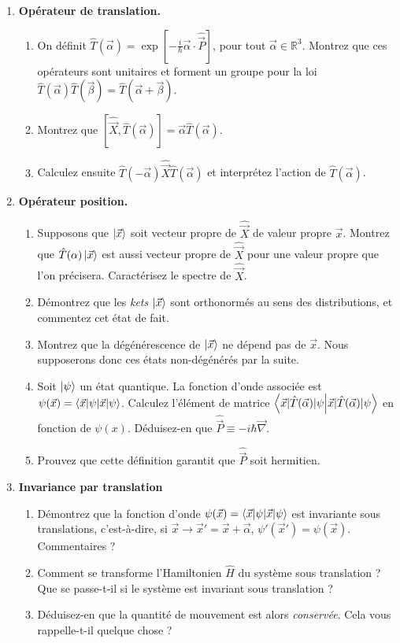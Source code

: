 \begin{enumerate}
\item \textbf{Opérateur de translation.}
\begin{enumerate}
\item On définit $\hat T(\vec\alpha) = \exp \left[{-\frac{i}{\hbar}\vec\alpha \cdot \hat{\vec P}}\right]$, pour tout $\vec\alpha \in \mathbb R^3$. Montrez que ces opérateurs sont unitaires et forment un groupe pour la loi $\hat T(\vec\alpha)\hat T(\vec\beta) = \hat T(\vec\alpha+\vec\beta)$. 
\item Montrez que $[\hat{\vec X},\hat T(\vec \alpha)] = \vec\alpha \hat T(\vec\alpha)$. 
\item Calculez ensuite $\hat T(-\vec\alpha) \hat{\vec X} \hat T(\vec\alpha)$ et interprétez l'action de $\hat T(\vec\alpha)$.
\end{enumerate}

\item \textbf{Opérateur position.}
\begin{enumerate}
\item Supposons que $\ket{\vec x}$ soit vecteur propre de $\hat{\vec X}$ de valeur propre $\vec x$. Montrez que $\hat T(\alpha)\ket{\vec x}$ est aussi vecteur propre de $\hat{\vec X}$ pour une valeur propre que l'on précisera. Caractérisez le spectre de $\hat{\vec X}$.
\item Démontrez que les \textit{kets} $\ket{\vec x}$ sont orthonormés au sens des distributions, et commentez cet état de fait. 
\item Montrez que la dégénérescence de $\ket{\vec x}$ ne dépend pas de $\vec x$. Nous supposerons donc ces états non-dégénérés par la suite.
\item Soit $\ket{\psi}$ un état quantique. La fonction d'onde associée est $\psi(\vec x) = \braket{\vec x|\psi}$. Calculez l'élément de matrice $\braket{\vec x|\hat T(\vec \alpha)|\psi}$ en fonction de $\psi(x)$. Déduisez-en que $\hat{\vec P} \equiv -i\hbar \vec\nabla$.
\item Prouvez que cette définition garantit que $\hat{\vec P}$ soit hermitien.
\end{enumerate}
\item \textbf{Invariance par translation}
\begin{enumerate}
\item Démontrez que la fonction d'onde $\psi(\vec x) = \braket{\vec x|\psi}$ est invariante sous translations, c'est-à-dire, si $\vec x \to \vec x' = \vec x +\vec \alpha$, $\psi'(\vec x') = \psi(\vec x)$. Commentaires ?
\item Comment se transforme l'Hamiltonien $\hat H$ du système sous translation ? Que se passe-t-il si le système est invariant sous translation ?
\item Déduisez-en que la quantité de mouvement est alors \textit{conservée}. Cela vous rappelle-t-il quelque chose ?
\end{enumerate}


\end{enumerate}
$ $



